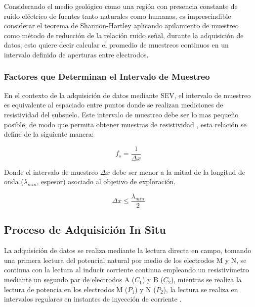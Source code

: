 			Considerando el medio geológico como una región con presencia constante de ruido eléctrico de fuentes tanto naturales como humanas, es imprescindible considerar el teorema de Shannon-Hartley aplicando apilamiento de muestreo como método de reducción de la relación ruido señal, durante la adquisición de datos; esto quiere decir calcular el promedio de muestreos continuos en un intervalo definido de aperturas entre electrodos.
			
				
			\subsubsection{Factores que Determinan el Intervalo de Muestreo}
		
				En el contexto de la adquisición de datos mediante SEV, el intervalo de muestreo es equivalente al espaciado entre puntos donde se realizan mediciones de resistividad del subsuelo. Este intervalo de muestreo debe ser lo mas pequeño posible, de modo que permita obtener muestras de resistividad \citep{telford1990}, esta relación se define de la siguiente manera:
				
				\begin{equation}
					f_{s}= \frac{1}{\Delta x}
				\end{equation}
				
				Donde el intervalo de muestreo $\Delta x$ debe ser menor a la mitad de la longitud de onda ($\lambda_{min}$, espesor) asociado al objetivo de exploración.
				
				\begin{equation}
					\Delta x \leq \frac{\lambda_{min} }{2}
				\end{equation}
				
				
			
		\subsection{Proceso de Adquisición In Situ}
			La adquisición de datos se realiza mediante la lectura directa en campo, tomando una primera lectura del potencial natural por medio de los electrodos M y N, se continua con la lectura al inducir corriente continua empleando un resistivímetro mediante  un segundo par de electrodos A ($C_{1}$) y B ($C_{2}$), mientras se realiza la lectura de potencia en los electrodos M ($P_{1}$) y N ($P_{2}$), la lectura se realiza en intervalos regulares en instantes de inyección de corriente \citep{telford1990}.
			
